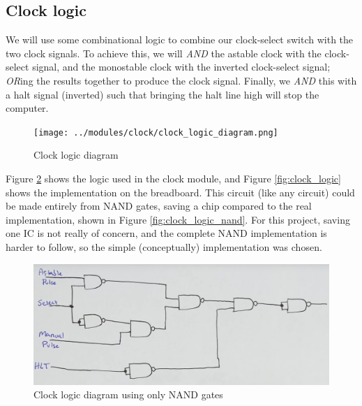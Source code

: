 \documentclass[12pt]{article}
\begin{document}
\begin{FlushLeft}
\clearpage


\subsection{Clock logic}
We will use some combinational logic to combine our clock-select switch with the two clock signals. To achieve this, we will \textit{AND} the astable clock with the clock-select signal, and the monostable clock with the inverted clock-select signal; \textit{OR}ing the results together to produce the clock signal. Finally, we \textit{AND} this with a halt signal (inverted) such that bringing the halt line high will stop the computer. \\

\begin{figure}[h]
  \begin{center}
    \texttt{[image: ../modules/clock/clock\_logic\_diagram.png]}
    \caption{Clock logic diagram}
    \label{fig:clock_logic_diagram}
  \end{center}
\end{figure}

Figure \ref{fig:clock_logic_diagram} shows the logic used in the clock module, and Figure \ref{fig:clock_logic} shows the implementation on the breadboard. This circuit (like any circuit) could be made entirely from NAND gates, saving a chip compared to the real implementation, shown in Figure \ref{fig:clock_logic_nand}. For this project, saving one IC is not really of concern, and the complete NAND implementation is harder to follow, so the simple (conceptually) implementation was chosen.

\begin{figure}[h]
  \begin{center}
    \includegraphics[width=0.9\linewidth]{../modules/clock/clock_logic_diagram_nand.png}
    \caption{Clock logic diagram using only NAND gates}
    \label{fig:clock_logic_diagram}
  \end{center}
\end{figure}


\end{FlushLeft}
\end{document}
